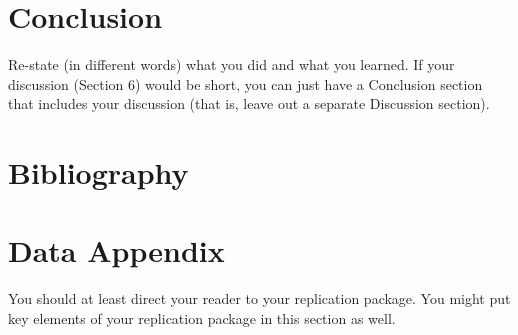 \documentclass[12pt]{article}
\begin{document}
\section{Conclusion}
\label{sec:conclusion}

Re-state (in different words) what you did and what you learned. If your discussion (Section 6) would be short, you can just have a Conclusion section that includes your discussion (that is, leave out a separate Discussion section).

\newpage
\section*{Bibliography}
\singlespacing
\setlength\bibsep{0pt}





\newpage
\section*{Data Appendix} \label{sec:appendixa}

You should at least direct your reader to your replication package. You might put key elements of your replication package in this section as well.
\end{document}
